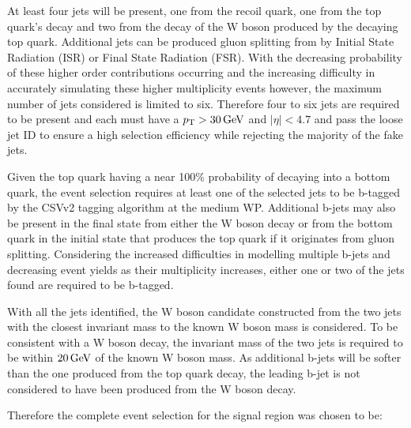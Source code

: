 At least four jets will be present, one from the recoil quark, one from the top quark's decay and two from the decay of the W boson produced by the decaying top quark.
Additional jets can be produced gluon splitting from by Initial State Radiation (ISR) or Final State Radiation (FSR).
With the decreasing probability of these higher order contributions occurring and the increasing difficulty in accurately simulating these higher multiplicity events however, the maximum number of jets considered is limited to six.
Therefore four to six jets are required to be present and each must have a $p_{\mathrm{T}} > 30\,\text{Ge\hspace{-.08em}V}$ and $|\eta| < 4.7$ and pass the loose jet ID to ensure a high selection efficiency while rejecting the majority of the fake jets.

Given the top quark having a near 100\% probability of decaying into a bottom quark, the event selection requires at least one of the selected jets to be b-tagged by the CSVv2 tagging algorithm at the medium WP.
Additional b-jets may also be present in the final state from either the W boson decay or from the bottom quark in the initial state that produces the top quark if it originates from gluon splitting.
Considering the increased difficulties in modelling multiple b-jets and decreasing event yields as their multiplicity increases, either one or two of the jets found are required to be b-tagged.

With all the jets identified, the W boson candidate constructed from the two jets with the closest invariant mass to the known W boson mass is considered.
To be consistent with a W boson decay, the invariant mass of the two jets is required to be within $20\,\text{Ge\hspace{-.08em}V}$ of the known W boson mass.
As additional b-jets will be softer than the one produced from the top quark decay, the leading b-jet is not considered to have been produced from the W boson decay.


Therefore the complete event selection for the signal region was chosen to be:

